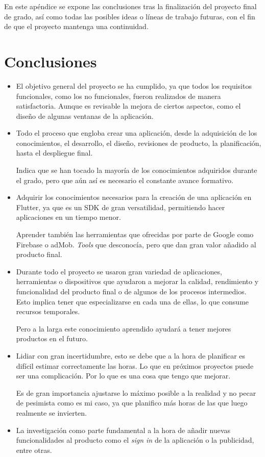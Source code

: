 
En este apéndice se expone las conclusiones tras la finalización del proyecto final de grado, así como todas las posibles ideas o líneas de trabajo futuras, con el fin de que el proyecto mantenga una continuidad.

\section{Conclusiones}

\begin{itemize}
	\item El objetivo general del proyecto se ha cumplido, ya que todos los requisitos funcionales, como los no funcionales, fueron realizados de manera satisfactoria. Aunque es revisable la mejora de ciertos aspectos, como el diseño de algunas ventanas de la aplicación.
		
	\item Todo el proceso que engloba crear una aplicación, desde la adquisición de los conocimientos, el desarrollo, el diseño, revisiones de producto, la planificación, hasta el despliegue final. 
	
	Indica que se han tocado la mayoría de los conocimientos adquiridos durante el grado, pero que aún así es necesario el constante avance formativo.
	
	\item Adquirir los conocimientos necesarios para la creación de una aplicación en Flutter, ya que es un SDK de gran versatilidad, permitiendo hacer aplicaciones en un tiempo menor.
	
	 Aprender también las herramientas que ofrecidas por parte de Google como Firebase o adMob. \emph{Tools} que desconocía, pero que dan gran valor añadido al producto final.
	
	\item Durante todo el proyecto se usaron gran variedad de aplicaciones, herramientas o dispositivos que ayudaron a mejorar la calidad, rendimiento y funcionalidad del producto final o de algunos de los procesos intermedios. Esto implica tener que especializarse en cada una de ellas, lo que consume recursos temporales.
	
	Pero a la larga este conocimiento aprendido ayudará a tener mejores productos en el futuro.
	
	\item Lidiar con gran incertidumbre, esto se debe que a la hora de planificar es difícil estimar correctamente las horas. Lo que en próximos proyectos puede ser una complicación. Por lo que es una cosa que tengo que mejorar.
	
	Es de gran importancia ajustarse lo máximo posible a la realidad y no pecar de pesimista como es mi caso, ya que planifico más horas de las que luego realmente se invierten.
	
	\item La investigación como parte fundamental a la hora de añadir nuevas funcionalidades al producto como el \emph{sign in} de la aplicación o la publicidad, entre otras.
	
\end{itemize}

